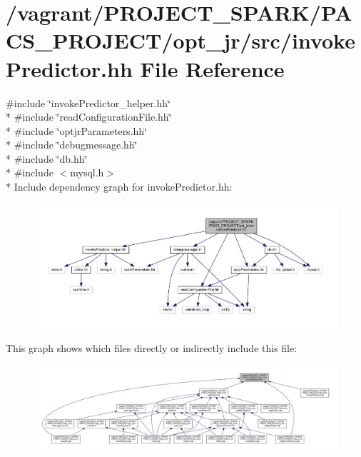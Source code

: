 \hypertarget{invokePredictor_8hh}{\section{/vagrant/\-P\-R\-O\-J\-E\-C\-T\-\_\-\-S\-P\-A\-R\-K/\-P\-A\-C\-S\-\_\-\-P\-R\-O\-J\-E\-C\-T/opt\-\_\-jr/src/invoke\-Predictor.hh File Reference}
\label{invokePredictor_8hh}
}
{\ttfamily \#include \char`\"{}invoke\-Predictor\-\_\-helper.\-hh\char`\"{}}\\*
{\ttfamily \#include \char`\"{}read\-Configuration\-File.\-hh\char`\"{}}\\*
{\ttfamily \#include \char`\"{}optjr\-Parameters.\-hh\char`\"{}}\\*
{\ttfamily \#include \char`\"{}debugmessage.\-hh\char`\"{}}\\*
{\ttfamily \#include \char`\"{}db.\-hh\char`\"{}}\\*
{\ttfamily \#include $<$mysql.\-h$>$}\\*
Include dependency graph for invoke\-Predictor.\-hh\-:
\nopagebreak
\begin{figure}[H]
\begin{center}
\leavevmode
\includegraphics[width=350pt]{invokePredictor_8hh__incl}
\end{center}
\end{figure}
This graph shows which files directly or indirectly include this file\-:
\nopagebreak
\begin{figure}[H]
\begin{center}
\leavevmode
\includegraphics[width=350pt]{invokePredictor_8hh__dep__incl}
\end{center}
\end{figure}
